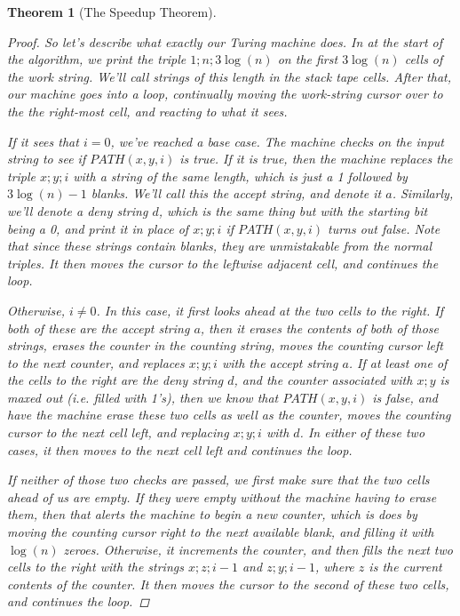 \documentclass{article}
\theoremstyle{definition}
\theoremstyle{plain}
\theoremstyle{theorem}
\newtheorem{theorem}{Theorem}[section]
\begin{document}
\begin{theorem}[The Speedup Theorem]
\begin{proof}
\par So let's describe what exactly our Turing machine does. In at the start of the algorithm, we print the triple $1;n;3\log(n)$ on the first $3\log(n)$ cells of the work string. We'll call strings of this length in the stack tape \textit{cells}. After that, our machine goes into a loop, continually moving the work-string cursor over to the the right-most cell, and reacting to what it sees.
\par If it sees that $i=0$, we've reached a base case. The machine checks on the input string to see if $PATH(x,y,i)$ is true. If it is true, then the machine replaces the triple $x;y;i$ with a string of the same length, which is just a 1 followed by $3\log(n)-1$ blanks. We'll call this the \textit{accept string}, and denote it $a$. Similarly, we'll denote a \textit{deny string} $d$, which is the same thing but with the starting bit being a 0, and print it in place of $x;y;i$ if $PATH(x,y,i)$ turns out false. Note that since these strings contain blanks, they are unmistakable from the normal triples. It then moves the cursor to the leftwise adjacent cell, and continues the loop.
\par Otherwise, $i \neq 0$. In this case, it first looks ahead at the two cells to the right. If both of these are the accept string $a$, then it erases the contents of both of those strings, erases the counter in the counting string, moves the counting cursor left to the next counter, and replaces $x;y;i$ with the accept string $a$. If at least one of the cells to the right are the deny string $d$, \textit{and} the counter associated with $x;y$ is maxed out (i.e. filled with 1's), then we know that $PATH(x,y,i)$ is false, and have the machine erase these two cells as well as the counter, moves the counting cursor to the next cell left, and replacing $x;y;i$ with $d$. In either of these two cases, it then moves to the next cell left and continues the loop.
\par If neither of those two checks are passed, we first make sure that the two cells ahead of us are empty. If they were empty without the machine having to erase them, then that alerts the machine to begin a new counter, which is does by moving the counting cursor right to the next available blank, and filling it with $\log(n)$ zeroes. Otherwise, it increments the counter, and then fills the next two cells to the right with the strings $x;z;i-1$ and $z;y;i-1$, where $z$ is the current contents of the counter. It then moves the cursor to the second of these two cells, and continues the loop.

\end{proof}
\end{theorem}
\end{document}
